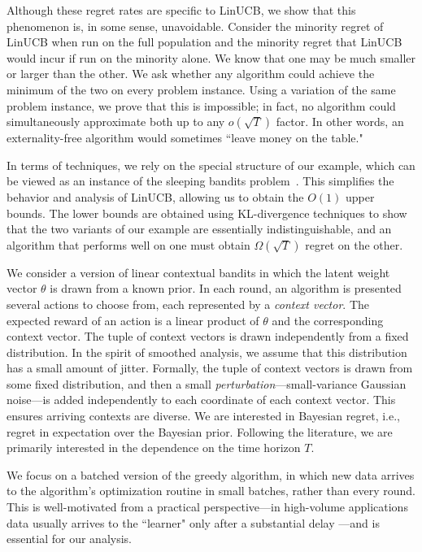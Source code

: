Although these regret rates are specific to LinUCB, we show that this phenomenon is, in some sense, unavoidable. Consider the minority regret of LinUCB when run on the full population and the minority regret that LinUCB would incur if run on the minority alone. We know that one may be much smaller or larger than the other. We ask whether any algorithm could  achieve the minimum of the two on every problem instance. Using a variation of the same problem instance, we prove that this is impossible; in fact, no algorithm could simultaneously approximate both up to any $o(\sqrt{T})$ factor. In other words, an externality-free algorithm would sometimes ``leave money on the table."


In terms of techniques, we rely on the special structure of our example, which can be viewed as an instance of the sleeping bandits problem~\citep{SleepingBandits-ml10}. This simplifies the behavior and analysis of LinUCB, allowing us to obtain the $O(1)$ upper bounds.  The lower bounds are obtained using KL-divergence techniques to show that the two variants of our example are essentially indistinguishable, and an algorithm that performs well on one must obtain $\Omega(\sqrt{T})$ regret on the other. 


 We consider a version of linear contextual bandits in which the latent weight vector $\theta$ is drawn from a known prior. In each round, an algorithm is presented several actions to choose from, each represented by a \emph{context vector}. The expected reward of an action is a linear product of $\theta$ and the corresponding context vector. The tuple of context vectors is drawn independently from a fixed distribution. In the spirit of smoothed analysis, we assume that this distribution has a small amount of jitter. Formally, the tuple of context vectors is drawn from some fixed distribution, and then a small \emph{perturbation}---small-variance Gaussian noise---is added independently to each coordinate of each context vector. This ensures arriving contexts are diverse. We are interested in Bayesian regret, i.e., regret in expectation over the Bayesian prior. Following the literature, we are primarily interested in the dependence on the time horizon $T$. 

We focus on a batched version of the greedy algorithm, in which new data arrives to the algorithm's optimization routine in small batches, rather than every round. This is well-motivated from a practical perspective---in high-volume applications data usually arrives to the ``learner" only after a substantial delay \citep{MWT-WhitePaper-2016,DS-arxiv}---and is essential for our analysis.

